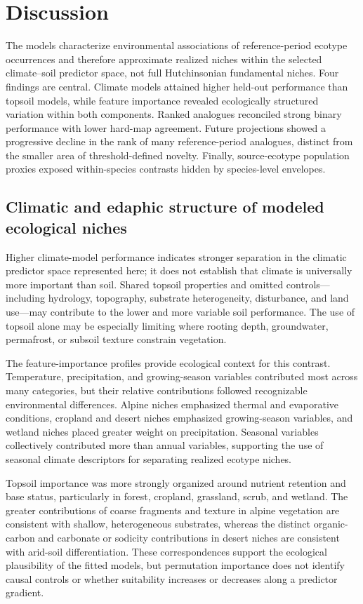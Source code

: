 \documentclass[11pt]{article}
\begin{document}
\FloatBarrier

\section{Discussion}

The models characterize environmental associations of reference-period ecotype
occurrences and therefore approximate realized niches within the selected
climate--soil predictor space, not full Hutchinsonian fundamental niches. Four
findings are central. Climate models attained higher held-out performance than
topsoil models, while feature importance revealed ecologically structured
variation within both components. Ranked analogues reconciled strong binary
performance with lower hard-map agreement. Future projections showed a
progressive decline in the rank of many reference-period analogues, distinct
from the smaller area of threshold-defined novelty. Finally, source-ecotype
population proxies exposed within-species contrasts hidden by species-level
envelopes.

\subsection{Climatic and edaphic structure of modeled ecological niches}

Higher climate-model performance indicates stronger separation in the
climatic predictor space represented here; it does not establish that climate
is universally more important than soil. Shared topsoil properties and omitted
controls---including hydrology, topography, substrate heterogeneity,
disturbance, and land use---may contribute to the lower and more variable soil
performance. The use of topsoil alone may be especially limiting where rooting
depth, groundwater, permafrost, or subsoil texture constrain vegetation.

The feature-importance profiles provide ecological context for this contrast.
Temperature, precipitation, and growing-season variables contributed most
across many categories, but their relative contributions followed recognizable
environmental differences. Alpine niches emphasized thermal and evaporative
conditions, cropland and desert niches emphasized growing-season variables,
and wetland niches placed greater weight on precipitation. Seasonal variables
collectively contributed more than annual variables, supporting the use of
seasonal climate descriptors for separating realized ecotype niches.

Topsoil importance was more strongly organized around nutrient retention and
base status, particularly in forest, cropland, grassland, scrub, and wetland.
The greater contributions of coarse fragments and texture in alpine vegetation
are consistent with shallow, heterogeneous substrates, whereas the distinct
organic-carbon and carbonate or sodicity contributions in desert niches are
consistent with arid-soil differentiation. These correspondences support the
ecological plausibility of the fitted models, but permutation importance does
not identify causal controls or whether suitability increases or decreases
along a predictor gradient.
\end{document}
